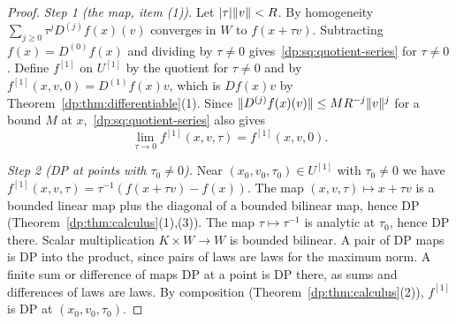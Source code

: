 \begin{proof}
\emph{Step 1 (the map, item (1)).} Let $\lvert \tau\rvert\lVert v\rVert<R$. By homogeneity $\sum_{j\ge0}\tau^jD^{(j)}f(x)(v)$ converges in $W$ to $f(x+\tau v)$. Subtracting $f(x)=D^{(0)}f(x)$ and dividing by $\tau\ne0$ gives~\eqref{dp:sq:quotient-series} for $\tau\ne0$. Define $f^{[1]}$ on $U^{[1]}$ by the quotient for $\tau\ne0$ and by $f^{[1]}(x,v,0)=D^{(1)}f(x)v$, which is $Df(x)v$ by Theorem~\ref{dp:thm:differentiable}(1). Since $\lVert D^{(j)}f(x)(v)\rVert\le MR^{-j}\lVert v\rVert^j$ for a bound $M$ at $x$,~\eqref{dp:sq:quotient-series} also gives
\begin{equation}\label{dp:sq:limit}
 \lim_{\tau\to0}f^{[1]}(x,v,\tau)=f^{[1]}(x,v,0).
\end{equation}

\emph{Step 2 (DP at points with $\tau_0\ne0$).} Near $(x_0,v_0,\tau_0)\in U^{[1]}$ with $\tau_0\ne0$ we have $f^{[1]}(x,v,\tau)=\tau^{-1}(f(x+\tau v)-f(x))$. The map $(x,v,\tau)\mapsto x+\tau v$ is a bounded linear map plus the diagonal of a bounded bilinear map, hence DP (Theorem~\ref{dp:thm:calculus}(1),(3)). The map $\tau\mapsto\tau^{-1}$ is analytic at $\tau_0$, hence DP there. Scalar multiplication $K\times W\to W$ is bounded bilinear. A pair of DP maps is DP into the product, since pairs of laws are laws for the maximum norm. A finite sum or difference of maps DP at a point is DP there, as sums and differences of laws are laws. By composition (Theorem~\ref{dp:thm:calculus}(2)), $f^{[1]}$ is DP at $(x_0,v_0,\tau_0)$.


\end{proof}
